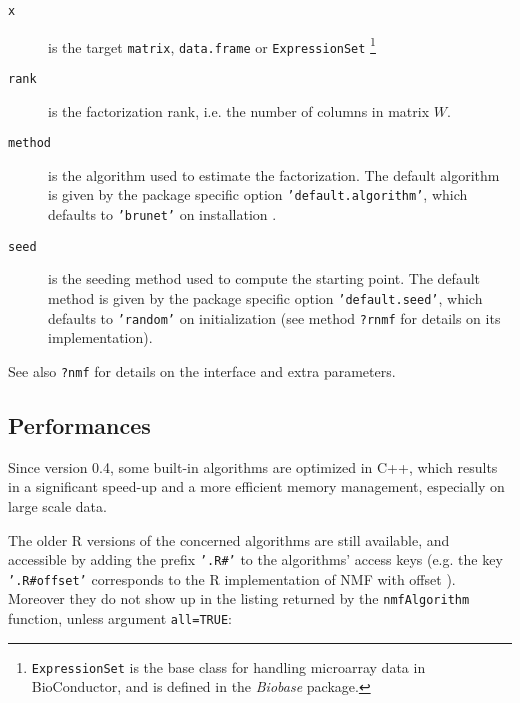 \documentclass[a4paper]{article}\usepackage{graphicx, color}
\let\code=\texttt
\newcommand{\pkgname}[1]{\textit{#1}\xspace}
\begin{document}
\begin{description}
\item[\code{x}] is the target \code{matrix}, \code{data.frame} or \code{ExpressionSet}
\footnote{\code{ExpressionSet} is the base class for handling microarray data in
BioConductor, and is defined in the \pkgname{Biobase} package.}
\item[\code{rank}] is the factorization rank, i.e. the number of columns in matrix $W$.
\item[\code{method}] is the algorithm used to estimate the factorization. 
The default algorithm is given by the package specific option \code{'default.algorithm'}, which defaults to \code{'brunet'} on installation \cite{Brunet2004}.
\item[\code{seed}] is the seeding method used to compute the starting point. 
The default method is given by the package specific option \code{'default.seed'}, which defaults to \code{'random'} on initialization (see method \code{?rnmf} for details on its implementation).
\end{description}

See also \code{?nmf} for details on the interface and extra parameters.


\subsection{Performances}

Since version 0.4, some built-in algorithms are optimized in C++, which results in a significant speed-up and a more efficient memory management, especially on large scale data.

The older R versions of the concerned algorithms are still available, and accessible by adding the prefix \code{'.R\#'} to the algorithms' access keys (e.g. the key \code{'.R\#offset'} corresponds to the R implementation of NMF with offset \cite{Badea2008}).
Moreover they do not show up in the listing returned by the \code{nmfAlgorithm} function, unless argument \code{all=TRUE}:
\end{document}
